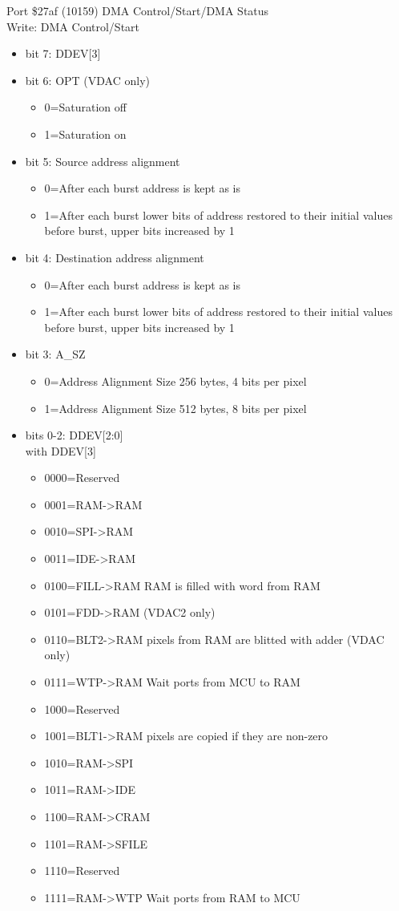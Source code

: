 Port \$27af (10159) DMA Control/Start/DMA Status\\
Write: DMA Control/Start
\begin{itemize}
\item[] bit 7: DDEV[3]
\item[] bit 6: OPT (VDAC only)
  \begin{itemize}
  \item[] 0=Saturation off
  \item[] 1=Saturation on
  \end{itemize}
\item[] bit 5: Source address alignment
  \begin{itemize}
  \item[] 0=After each burst address is kept as is
  \item[] 1=After each burst lower bits of address restored to their
    initial values before burst, upper bits increased by 1
  \end{itemize}
\item[] bit 4: Destination address alignment
  \begin{itemize}
  \item[] 0=After each burst address is kept as is
  \item[] 1=After each burst lower bits of address restored to their
    initial values before burst, upper bits increased by 1
  \end{itemize}
\item[] bit 3: A\_SZ
  \begin{itemize}
  \item[] 0=Address Alignment Size 256 bytes, 4 bits per pixel
  \item[] 1=Address Alignment Size 512 bytes, 8 bits per pixel
  \end{itemize}
\item[] bits 0-2: DDEV[2:0]\\
  with DDEV[3]
  \begin{itemize}
  \item[] 0000=Reserved
  \item[] 0001=RAM->RAM
  \item[] 0010=SPI->RAM
  \item[] 0011=IDE->RAM
  \item[] 0100=FILL->RAM RAM is filled with word from RAM
  \item[] 0101=FDD->RAM (VDAC2 only)
  \item[] 0110=BLT2->RAM pixels from RAM are blitted with adder (VDAC only)
  \item[] 0111=WTP->RAM Wait ports from MCU to RAM
  \item[] 1000=Reserved
  \item[] 1001=BLT1->RAM pixels are copied if they are non-zero
  \item[] 1010=RAM->SPI
  \item[] 1011=RAM->IDE
  \item[] 1100=RAM->CRAM
  \item[] 1101=RAM->SFILE
  \item[] 1110=Reserved
  \item[] 1111=RAM->WTP Wait ports from RAM to MCU
  \end{itemize}
\end{itemize}
